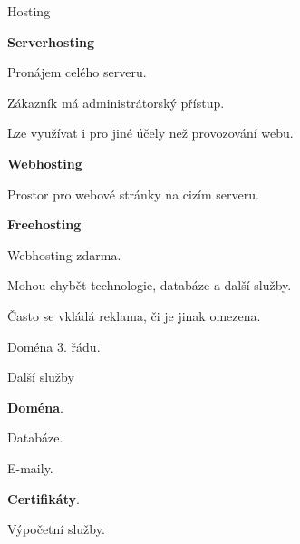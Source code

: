 \documentclass[aspectratio=1610]{beamer}
\begin{document}
\begin{frame}{Hosting}
    \begin{multicols}{3}
        \centering

        \begin{cardTiny}
            \begin{flushleft}
                \textbf{Serverhosting}

                Pronájem celého serveru.

                Zákazník má administrátorský přístup.

                Lze využívat i pro jiné účely než provozování webu.
            \end{flushleft}
        \end{cardTiny}

        \begin{cardTiny}
            \begin{flushleft}
                \textbf{Webhosting}

                Prostor pro webové stránky na cizím serveru.
            \end{flushleft}
        \end{cardTiny}

        \begin{cardTiny}
            \begin{flushleft}
                \textbf{Freehosting}

                Webhosting zdarma.

                Mohou chybět technologie, databáze a další služby.

                Často se vkládá reklama, či je jinak omezena.

                Doména 3. řádu.
            \end{flushleft}
        \end{cardTiny}
    \end{multicols}
\end{frame}

\begin{frame}{Další služby}
    \begin{cardTiny}
        \begin{flushleft}
            \textbf{Doména}.

            Databáze.

            E-maily.

            \textbf{Certifikáty}.

            Výpočetní služby.
        \end{flushleft}
    \end{cardTiny}
\end{frame}
\end{document}
